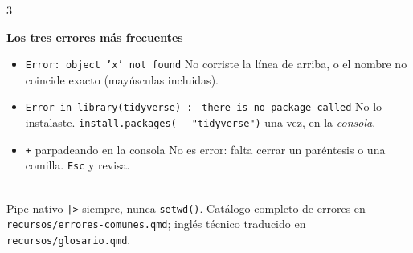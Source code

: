 \documentclass[9pt]{extarticle}
\newcommand{\tarea}[1]{%
  \par\vspace{8pt}%
  \noindent\colorbox{verdeITAM}{\parbox[c][14pt]{\dimexpr\linewidth-2\fboxsep\relax}{\hspace{2pt}\color{white}\bfseries\fontsize{9.3}{10}\selectfont #1}}%
  \par\vspace{4pt}%
}
\newcommand{\co}[1]{\texttt{\color{verdeProfundo}#1}}
\begin{document}
\begin{multicols}{3}
\tarea{Los tres errores más frecuentes}
\begin{itemize}
  \item \co{Error: object 'x' not found} \newline
    No corriste la línea de arriba, o el nombre no coincide exacto (mayúsculas incluidas).
  \item \co{Error in library(tidyverse) :} \newline\co{ there is no package called}\newline
    No lo instalaste. \co{install.packages(} \newline \co{\ \ "tidyverse")} una vez, en la \emph{consola}.
  \item \co{+} parpadeando en la consola \newline
    No es error: falta cerrar un paréntesis o una comilla. \co{Esc} y revisa.
\end{itemize}

\vspace{4pt}
\noindent{\color{grisTenue}\rule{\linewidth}{0.4pt}}\\[2pt]
{\fontsize{7.6}{8.6}\selectfont\color{grisTexto}
Pipe nativo \co{|>} siempre, nunca \co{setwd()}. Catálogo completo de errores en
\co{recursos/errores-comunes.qmd}; inglés técnico traducido en \co{recursos/glosario.qmd}.
}

\end{multicols}
\end{document}
